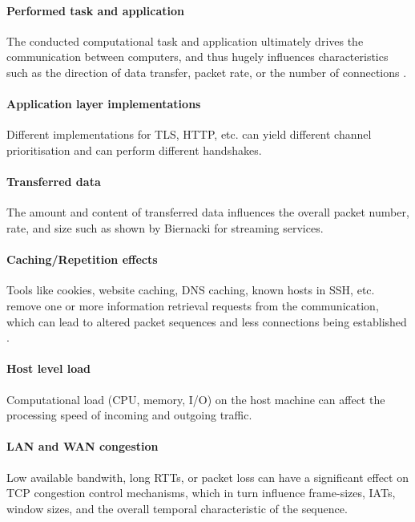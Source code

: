 \documentclass[conference]{IEEEtran}
\begin{document}

 
\paragraph{Performed task and application}
The conducted computational task and application ultimately drives the communication between computers, and thus hugely influences characteristics such as the direction of data transfer, packet rate, or the number of connections \cite{stober2013you}.


\paragraph{Application layer implementations}
Different implementations for TLS, HTTP, etc. can yield different channel prioritisation and can perform different handshakes.

\paragraph{Transferred data} 
The amount and content of transferred data influences the overall packet number, rate, and size such as shown by Biernacki \cite{biernacki2017analysis} for streaming services.


\paragraph{Caching/Repetition effects}
Tools like cookies, website caching, DNS caching, known hosts in SSH, etc. remove one or more information retrieval requests from the communication, which can lead to altered packet sequences and less connections being established \cite{fricker2012impact}.


\paragraph{Host level load}
Computational load (CPU, memory, I/O) on the host machine can affect the processing speed of incoming and outgoing traffic.

\paragraph{LAN and WAN congestion}
Low available bandwith, long RTTs, or packet loss can have a significant effect on TCP congestion control mechanisms, which in turn influence frame-sizes, IATs, window sizes, and the overall temporal characteristic of the sequence.
\end{document}
